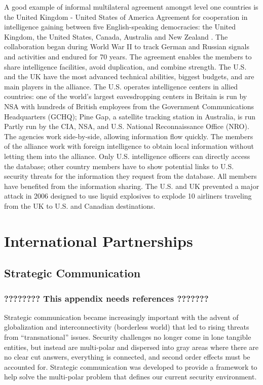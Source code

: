 \documentclass{report}
\begin{document}
A good example of informal multilateral agreement amongst level one countries is the United Kingdom - United States of America Agreement for cooperation in intelligence gaining between five English-speaking democracies: the United Kingdom, the United States, Canada, Australia and New Zealand \cite{Cox2012}. The collaboration began during World War II to track German and Russian signals and activities and endured for 70 years. The agreement enables the members to share intelligence facilities, avoid duplication, and combine strength. The U.S. and the UK have the most advanced technical abilities, biggest budgets, and are main players in the alliance. The U.S. operates intelligence centers in allied countries: one of the world's largest eavesdropping centers in Britain is run by NSA with hundreds of British employees from the Government Communications Headquarters (GCHQ); Pine Gap, a satellite tracking station in Australia, is run Partly run by the CIA, NSA, and U.S. National Reconnaissance Office (NRO). The agencies work side-by-side, allowing information flow quickly. The members of the alliance work with foreign intelligence to obtain local information without letting them into the alliance. Only U.S. intelligence officers can directly access the database; other country members have to show potential links to U.S. security threats for the information they request from the database. All members have benefited from the information sharing. The U.S. and UK prevented a major attack in 2006 designed to use liquid explosives to explode 10 airliners traveling from the UK to U.S. and Canadian destinations. 


\chapter[Appendix G: International Partnerships]{International Partnerships} \label{app:partners}

\section{Strategic Communication }

\subsection{????????  This appendix needs references  ???????}


Strategic communication became increasingly important with the advent of globalization and interconnectivity (borderless world) that led to rising threats from \enquote{transnational} issues. Security challenges no longer come in lone tangible entities, but instead are multi-polar and dispersed into gray areas where there are no clear cut answers, everything is connected, and second order effects must be accounted for. Strategic communication was developed to provide a framework to help solve the multi-polar problem that defines our current security environment.
\end{document}
